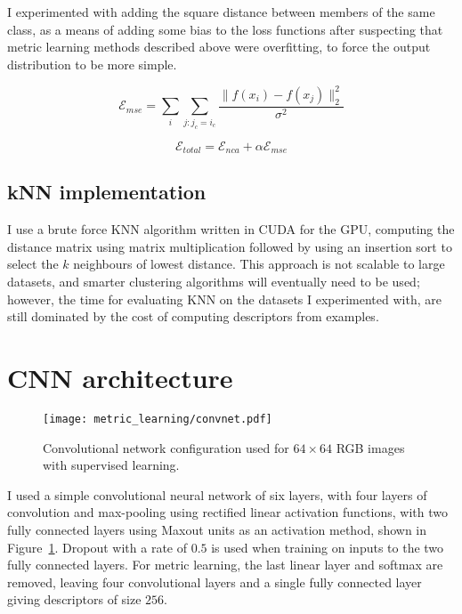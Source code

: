 I experimented with adding the square distance between members of the same class, as a means of adding some bias to the loss functions after suspecting that metric learning methods described above were overfitting, to force the output distribution to be more simple. 

\begin{equation}
\label{eqn:mse}
\mathcal{E}_{mse} = \sum_i{ \sum_{j:j_c = i_c}  \frac {{\lVert f(x_i) - f(x_j) \rVert^2_2}} {\sigma^2} }
\end{equation}

\begin{equation}
\label{eqn:mse_total}
\mathcal{E}_{total} =  \mathcal{E}_{nca} + \alpha \mathcal{E}_{mse}
\end{equation}


\subsection {kNN implementation}

I use a brute force \gls{KNN} algorithm written in CUDA \cite{Garcia2008} for the \gls{GPU}, computing the distance matrix using matrix multiplication followed by using an insertion sort to select the $ k $ neighbours of lowest distance. This approach is not scalable to large datasets, and smarter clustering algorithms will eventually need to be used; however, the time for evaluating \gls{KNN} on the datasets I experimented with, are still dominated by the cost of computing descriptors from examples. 


\section {CNN architecture}


\begin{figure}[ht]
\centering
\texttt{[image: metric\_learning/convnet.pdf]}
\caption{Convolutional network configuration used for $64\times64$ RGB images with supervised learning.}
\label{fig:metric_convnet}
\end{figure}

I used a simple convolutional neural network of six layers, with four layers of convolution and max-pooling using rectified linear activation functions, with two fully connected layers using Maxout \cite{Springenberg2013} units as an activation method, shown in Figure~\ref{fig:metric_convnet}. Dropout \cite{HintonDropout} with a rate of $ 0.5 $ is used when training on inputs to the two fully connected layers. For metric learning, the last linear layer and softmax are removed, leaving four convolutional layers and a single fully connected layer giving descriptors of size $ 256 $.

